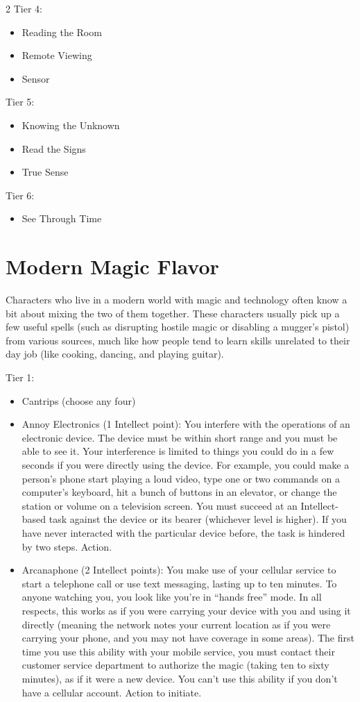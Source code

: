 \begin{multicols}{2}
Tier 4:
\begin{itemize}
\item Reading the Room 
\item Remote Viewing
\item Sensor 
\end{itemize}

Tier 5:
\begin{itemize}
\item Knowing the Unknown 
\item Read the Signs 
\item True Sense 
\end{itemize}

Tier 6:
\begin{itemize}
\item See Through Time 
\end{itemize}

\section{Modern Magic Flavor} 

Characters who live in a modern world with magic and technology often know a bit about mixing the two of them together. These characters usually pick up a few useful spells (such as disrupting hostile magic or disabling a mugger’s pistol) from various sources, much like how people tend to learn skills unrelated to their day job (like cooking, dancing, and playing guitar).

Tier 1:
\begin{itemize}
\item Cantrips (choose any four)
\item Annoy Electronics (1 Intellect point): You interfere with the operations of an electronic device. The device must be within short range and you must be able to see it. Your interference is limited to things you could do in a few seconds if you were directly using the device. For example, you could make a person’s phone start playing a loud video, type one or two commands on a computer’s keyboard, hit a bunch of buttons in an elevator, or change the station or volume on a television screen. You must succeed at an Intellect-based task against the device or its bearer (whichever level is higher). If you have never interacted with the particular device before, the task is hindered by two steps. Action. 
\item Arcanaphone (2 Intellect points): You make use of your cellular service to start a telephone call or use text messaging, lasting up to ten minutes. To anyone watching you, you look like you’re in “hands free” mode. In all respects, this works as if you were carrying your device with you and using it directly (meaning the network notes your current location as if you were carrying your phone, and you may not have coverage in some areas). The first time you use this ability with your mobile service, you must contact their customer service department to authorize the magic (taking ten to sixty minutes), as if it were a new device. You can’t use this ability if you don’t have a cellular account. Action to initiate. 


\end{itemize}
\end{multicols}
